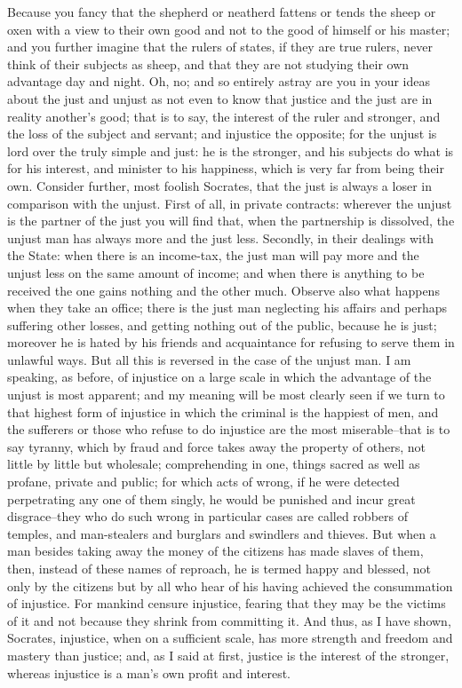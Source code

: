 Because you fancy that the shepherd or neatherd fattens or tends the
sheep or oxen with a view to their own good and not to the good of
himself or his master; and you further imagine that the rulers of
states, if they are true rulers, never think of their subjects as sheep,
and that they are not studying their own advantage day and night. Oh,
no; and so entirely astray are you in your ideas about the just and
unjust as not even to know that justice and the just are in reality
another's good; that is to say, the interest of the ruler and stronger,
and the loss of the subject and servant; and injustice the opposite; for
the unjust is lord over the truly simple and just: he is the stronger,
and his subjects do what is for his interest, and minister to his
happiness, which is very far from being their own. Consider further,
most foolish Socrates, that the just is always a loser in comparison
with the unjust. First of all, in private contracts: wherever the unjust
is the partner of the just you will find that, when the partnership is
dissolved, the unjust man has always more and the just less. Secondly,
in their dealings with the State: when there is an income-tax, the just
man will pay more and the unjust less on the same amount of income;
and when there is anything to be received the one gains nothing and the
other much. Observe also what happens when they take an office; there is
the just man neglecting his affairs and perhaps suffering other losses,
and getting nothing out of the public, because he is just; moreover he
is hated by his friends and acquaintance for refusing to serve them in
unlawful ways. But all this is reversed in the case of the unjust man.
I am speaking, as before, of injustice on a large scale in which the
advantage of the unjust is most apparent; and my meaning will be most
clearly seen if we turn to that highest form of injustice in which the
criminal is the happiest of men, and the sufferers or those who refuse
to do injustice are the most miserable--that is to say tyranny, which by
fraud and force takes away the property of others, not little by little
but wholesale; comprehending in one, things sacred as well as profane,
private and public; for which acts of wrong, if he were detected
perpetrating any one of them singly, he would be punished and incur
great disgrace--they who do such wrong in particular cases are called
robbers of temples, and man-stealers and burglars and swindlers and
thieves. But when a man besides taking away the money of the citizens
has made slaves of them, then, instead of these names of reproach, he is
termed happy and blessed, not only by the citizens but by all who
hear of his having achieved the consummation of injustice. For mankind
censure injustice, fearing that they may be the victims of it and not
because they shrink from committing it. And thus, as I have shown,
Socrates, injustice, when on a sufficient scale, has more strength and
freedom and mastery than justice; and, as I said at first, justice is
the interest of the stronger, whereas injustice is a man's own profit
and interest.

